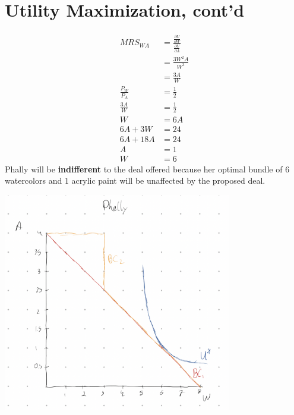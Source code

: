 \documentclass[8pt]{extarticle}
\begin{document}
{\section{Utility Maximization, cont'd}
\begin{align*}
	MRS_{WA} &= \frac{\frac{\partial U}{\partial W}}{\frac{\partial U}{\partial A}}\\
	&= \frac{3W^2A}{W^3} \\
	&= \frac{3A}{W} \\
	\frac{P_W}{P_A} &= \frac{1}{2} \\
	\frac{3A}{W} &= \frac{1}{2} \\
	W &= 6A \\
	6A + 3W &= 24 \\
	6A + 18A &= 24 \\
	A &= 1 \\
	W &= 6
\end{align*}
Phally will be \textbf{indifferent} to the deal offered because her optimal bundle of $6$ watercolors and $1$ acrylic paint will be unaffected by the proposed deal.
\begin{center}
	\includegraphics[width=10cm]{HW3Q10}
\end{center}
}
\end{document}
